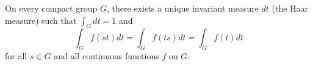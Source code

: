 On every compact group $G$, there exists a unique invariant measure $dt$ (the Haar measure) such that $\int_G dt = 1$ and
$$\int_G f(st) dt = \int_G f(ts) dt = \int_G f(t) dt$$
for all $s \in G$ and all continuous functions $f$ on $G$.
